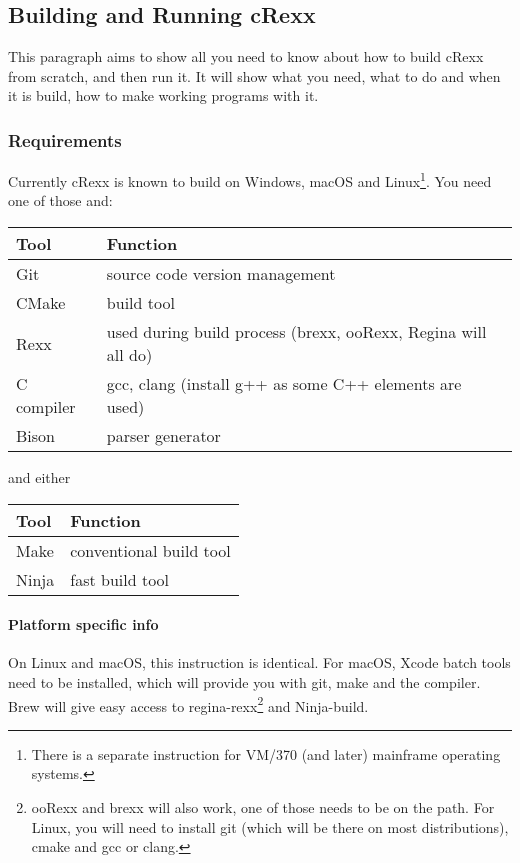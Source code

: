 \hypertarget{building-and-running-crexx}{%
\subsection{Building and Running
cRexx}\label{building-and-running-crexx}}

This paragraph aims to show all you need to know about how to build
cRexx from scratch, and then run it. It will show what you need, what to
do and when it is build, how to make working programs with it.

\hypertarget{requirements}{%
\subsubsection{Requirements}\label{requirements}}

Currently cRexx is known to build on Windows, macOS and
Linux\footnote{There is a separate instruction for VM/370 (and later)
  mainframe operating systems.}. You need one of those and:

\begin{longtable}[]{@{}ll@{}}
\toprule()
Tool & Function \\
\midrule()
\endhead
Git & source code version management \\
CMake & build tool \\
Rexx & used during build process (brexx, ooRexx, Regina will all do) \\
C compiler & gcc, clang (install g++ as some C++ elements are used) \\
Bison & parser generator \\
\bottomrule()
\end{longtable}

and either

\begin{longtable}[]{@{}ll@{}}
\toprule()
Tool & Function \\
\midrule()
\endhead
Make & conventional build tool \\
Ninja & fast build tool \\
\bottomrule()
\end{longtable}

\hypertarget{platform-specific-info}{%
\paragraph{Platform specific info}\label{platform-specific-info}}

On Linux and macOS, this instruction is identical. For macOS, Xcode
batch tools need to be installed, which will provide you with git, make
and the compiler. Brew will give easy access to regina-rexx\footnote{ooRexx
  and brexx will also work, one of those needs to be on the path. For
  Linux, you will need to install git (which will be there on most
  distributions), cmake and gcc or clang.} and Ninja-build.

